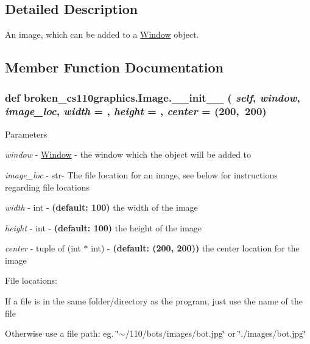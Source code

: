 \subsection{Detailed Description}
An image, which can be added to a \hyperlink{classbroken__cs110graphics_1_1Window}{Window} object. 

\subsection{Member Function Documentation}
\hypertarget{classbroken__cs110graphics_1_1Image_aa8de88ab79fc10411c764a11e8572a09}{
\subsubsection[{\_\-\_\-init\_\-\_\-}]{\setlength{\rightskip}{0pt plus 5cm}def broken\_\-cs110graphics.Image.\_\-\_\-init\_\-\_\- ( {\em self}, \/   {\em window}, \/   {\em image\_\-loc}, \/   {\em width} = {}, \/   {\em height} = {}, \/   {\em center} = {\ttfamily (200,~200})}}
\label{classbroken__cs110graphics_1_1Image_aa8de88ab79fc10411c764a11e8572a09}

\begin{DoxyParams}{Parameters}
\item[{\em window}]-\/ \hyperlink{classbroken__cs110graphics_1_1Window}{Window} -\/ the window which the object will be added to \item[{\em image\_\-loc}]-\/ str-\/ The file location for an image, see below for instructions regarding file locations \item[{\em width}]-\/ int -\/ {\bfseries (default: 100)} the width of the image \item[{\em height}]-\/ int -\/ {\bfseries (default: 100)} the height of the image \item[{\em center}]-\/ tuple of (int $\ast$ int) -\/ {\bfseries (default: (200, 200))} the center location for the image\end{DoxyParams}
File locations:
\begin{DoxyItemize}
\item If a file is in the same folder/directory as the program, just use the name of the file
\item Otherwise use a file path: eg. \char`\"{}$\sim$/110/bots/images/bot.jpg\char`\"{} or \char`\"{}./images/bot.jpg\char`\"{}
\end{DoxyItemize}

